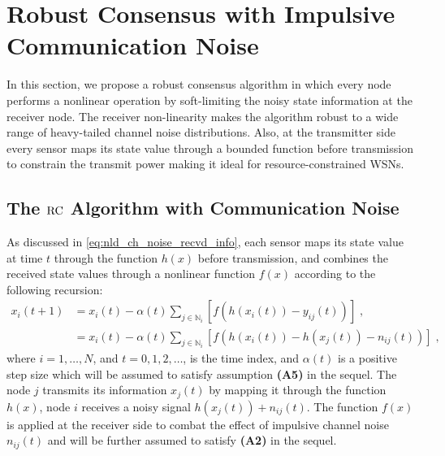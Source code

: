 \documentclass[onecolumn, draft, 12pt]{IEEEtran}
\newcommand{\rnld}{\rm RC}
\begin{document}
\section{Robust Consensus with Impulsive Communication Noise} \label{sec:consensus_with_noise_robust}
In this section, we propose a robust consensus algorithm in which every node performs a nonlinear operation by soft-limiting the noisy state information at the receiver node. The receiver non-linearity makes the algorithm robust to a wide range of heavy-tailed channel noise distributions. Also, at the transmitter side every sensor maps its state value through a bounded function before transmission to constrain the transmit power making it ideal for resource-constrained WSNs. 

\subsection{The $\rnld$ Algorithm with Communication Noise}\label{subsec:nld_with_noise_robust}
As discussed in \eqref{eq:nld_ch_noise_recvd_info}, each sensor maps its state value at time $t$ through the function $h(x)$ before transmission, and combines the received state values through a nonlinear function $f(x)$ according to the following recursion: \begin{align}
\nonumber
x_{i}(t+1) & = x_{i}(t) - \alpha(t) \displaystyle\sum_{j \in \mathbb{N}_{i} } \left [ f \left( h(x_{i}(t)) - y_{ij}(t) \right) \right ] \;,\\                
\label{eq:nld_ch_noise_robust}
           & = x_{i}(t) - \alpha(t) \displaystyle\sum_{j \in \mathbb{N}_{i} } \left [ f \left( h(x_{i}(t)) - h(x_{j}(t)) - n_{ij}(t) \right) \right ] \;,
\end{align}
where $i=1, \ldots, N$, and $t=0,1,2,\ldots$, is the time index, and $\alpha(t)$ is a positive step size which will be assumed to satisfy assumption \textbf{(A5)} in the sequel. The node $j$ transmits its information $x_{j}(t)$ by mapping it through the function $h(x)$, node $i$ receives a noisy signal $h(x_{j}(t))+ n_{ij}(t)$. The function $f(x)$ is applied at the receiver side to combat the effect of impulsive channel noise $n_{ij}(t)$ and will be further assumed to satisfy \textbf{(A2)} in the sequel.
\end{document}
